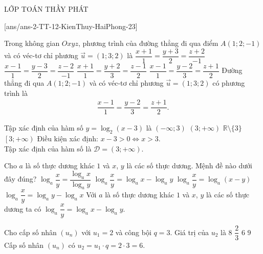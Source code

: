 \begin{name}
	{\tenchude}{\tendethi}{LỚP TOÁN THẦY PHÁT}{\thoigian}
\end{name}
\setcounter{ex}{0}\setcounter{bt}{0}
[ans/ans-2-TT-12-KienThuy-HaiPhong-23]

\begin{ex}%
	Trong không gian $Oxyz$, phương trình của đường thẳng đi qua điểm $A(1;2;-1)$ và có véc-tơ chỉ phương $\overrightarrow{u}=(1;3;2)$ là
	\choice
	{$\dfrac{x+1}{1}=\dfrac{y+3}{2}=\dfrac{z+2}{-1}$}
	{$\dfrac{x-1}{1}=\dfrac{y-3}{2}=\dfrac{z-2}{-1}$}
	{$\dfrac{x+1}{1}=\dfrac{y+2}{3}=\dfrac{z-1}{2}$}
	{\True $\dfrac{x-1}{1}=\dfrac{y-2}{3}=\dfrac{z+1}{2}$}
	\loigiai
	{
		Đường thẳng đi qua $A(1;2;-1)$ và có véc-tơ chỉ phương $\overrightarrow{u}=(1;3;2)$ có phương trình là
		\begin{align*}
			\dfrac{x-1}{1}=\dfrac{y-2}{3}=\dfrac{z+1}{2}.
		\end{align*}	
	}
\end{ex}

\begin{ex}%
	Tập xác định của hàm số $y=\log_2 (x-3)$ là
	\choice
	{$(-\infty;3)$}
	{\True $(3;+\infty)$}
	{$\mathbb{R}\setminus \{3\}$}
	{$\left[3;+\infty\right)$}
	\loigiai
	{
		Điều kiện xác định: $x-3>0\Leftrightarrow x>3$.\\
		Tập xác định của hàm số là $\mathscr{D}=(3;+\infty)$.
	}
\end{ex}

\begin{ex}%
	Cho $a$ là số thực dương khác $1$ và $x$, $y$ là các số thực dương. Mệnh đề nào dưới đây đúng?
	\choice
	{$\log_a \dfrac{x}{y}=\dfrac{\log_a x}{\log_a y}$}
	{\True $\log_a \dfrac{x}{y}=\log_a x-\log_a y$}
	{$\log_a \dfrac{x}{y}=\log_a (x-y)$}
	{$\log_a \dfrac{x}{y}=\log_a y-\log_a x$}
	\loigiai
	{
		Với $a$ là số thực dương khác $1$ và $x$, $y$ là các số thực dương ta có $\log_a \dfrac{x}{y}=\log_a x-\log_a y$.
	}
\end{ex}

\begin{ex}%
	Cho cấp số nhân $(u_n)$ với $u_1=2$ và công bội $q=3$. Giá trị của $u_2$ là
	\choice
	{$8$}
	{$\dfrac{2}{3}$}
	{\True $6$}
	{$9$}
	\loigiai
	{
		Cấp số nhân $(u_n)$ có $u_2=u_1\cdot q=2\cdot 3=6$.	
	}
\end{ex}

